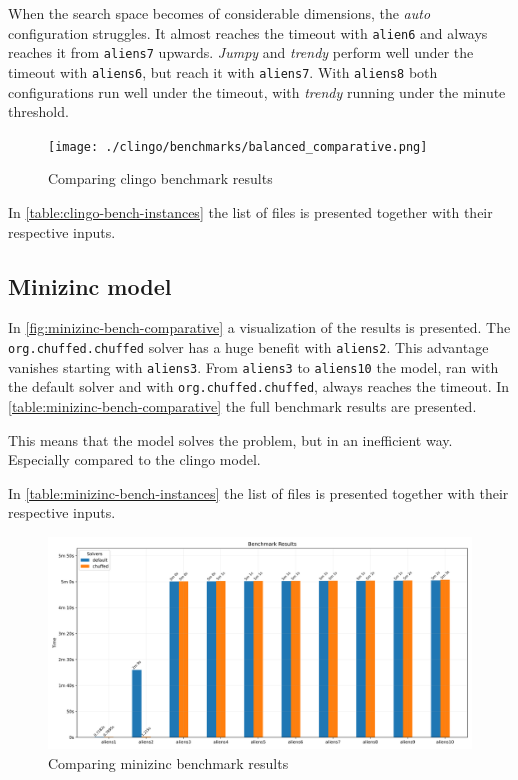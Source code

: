 \documentclass[11pt]{article}
\begin{document}
When the search space becomes of considerable dimensions, the \textit{auto} configuration struggles.
It almost reaches the timeout with \texttt{alien6} and always reaches it from \texttt{aliens7} upwards.
\textit{Jumpy} and \textit{trendy} perform well under the timeout with \texttt{aliens6}, but reach it with \texttt{aliens7}.
With \texttt{aliens8} both configurations run well under the timeout, with \textit{trendy} running under the minute threshold.

\begin{figure}[h]
  \centering
  \texttt{[image: ./clingo/benchmarks/balanced\_comparative.png]}
  \caption{Comparing clingo benchmark results}
  \label{fig:clingo-bench-comparative}
\end{figure}

In \autoref{table:clingo-bench-instances} the list of files is presented together with their respective inputs.


\subsection{Minizinc model}

In \autoref{fig:minizinc-bench-comparative} a visualization of the results is presented.
The \texttt{org.chuffed.chuffed} solver has a huge benefit with \texttt{aliens2}.
This advantage vanishes starting with \texttt{aliens3}.
From \texttt{aliens3} to \texttt{aliens10} the model, ran with the default solver and with \texttt{org.chuffed.chuffed}, always reaches the timeout.
In \autoref{table:minizinc-bench-comparative} the full benchmark results are presented.

This means that the model solves the problem, but in an inefficient way.
Especially compared to the clingo model.

In \autoref{table:minizinc-bench-instances} the list of files is presented together with their respective inputs.


\begin{figure}[h]
  \centering
  \includegraphics[width=\textwidth]{./minizinc/benchmarks/balanced_comparative.png}
  \caption{Comparing minizinc benchmark results}
  \label{fig:minizinc-bench-comparative}
\end{figure}
\end{document}

